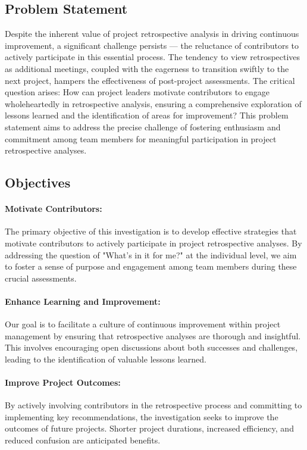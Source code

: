 \documentclass{article}
\begin{document}
\subsection{Problem Statement}
Despite the inherent value of project retrospective analysis in driving continuous improvement, a significant challenge persists — the reluctance of contributors to actively participate in this essential process. The tendency to view retrospectives as additional meetings, coupled with the eagerness to transition swiftly to the next project, hampers the effectiveness of post-project assessments. The critical question arises: How can project leaders motivate contributors to engage wholeheartedly in retrospective analysis, ensuring a comprehensive exploration of lessons learned and the identification of areas for improvement? This problem statement aims to address the precise challenge of fostering enthusiasm and commitment among team members for meaningful participation in project retrospective analyses.

    \newpage

\subsection{Objectives}
\paragraph*{Motivate Contributors:}
The primary objective of this investigation is to develop effective strategies that motivate contributors to actively participate in project retrospective analyses. By addressing the question of "What’s in it for me?" at the individual level, we aim to foster a sense of purpose and engagement among team members during these crucial assessments.

\paragraph*{Enhance Learning and Improvement:} Our goal is to facilitate a culture of continuous improvement within project management by ensuring that retrospective analyses are thorough and insightful. This involves encouraging open discussions about both successes and challenges, leading to the identification of valuable lessons learned.

\paragraph*{Improve Project Outcomes:} By actively involving contributors in the retrospective process and committing to implementing key recommendations, the investigation seeks to improve the outcomes of future projects. Shorter project durations, increased efficiency, and reduced confusion are anticipated benefits.
    
\end{document}

